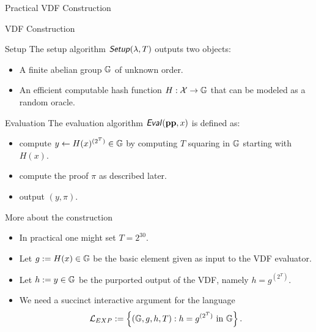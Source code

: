 \documentclass[UTF8]{beamer}
\begin{document}
	\begin{frame}
		\centering
		\huge Practical VDF Construction
	\end{frame}
	\begin{frame}{VDF Construction}
		\begin{block}{Setup}
			The setup algorithm $\textsf{\textit{Setup}}(\lambda,T)$ outputs two objects:
			\begin{itemize}
				\item A finite abelian group $\mathbb{G}$ of unknown order.
				\item An efficient computable hash function $H:\mathcal{X}\to\mathbb{G}$ that can be modeled as a random oracle.
			\end{itemize}
		\end{block}
		\begin{block}{Evaluation}
			The evaluation algorithm $\textsf{\textit{Eval}}(\mathbf{pp},x)$ is defined as:
			\begin{itemize}
				\item compute $y\gets H(x)^{(2^T)}\in\mathbb{G}$ by computing $T$ squaring in $\mathbb{G}$ starting with $H(x)$.
				\item compute the proof $\pi$ as described later.
				\item output $(y,\pi)$.
			\end{itemize}
		\end{block}
	\end{frame}
	\begin{frame}{More about the construction}
		\begin{block}{}
			\begin{itemize}
				\item In practical one might set $T=2^{30}$.
				\item Let $g:=H(x)\in\mathbb{G}$ be the basic element given as input to the VDF evaluator.
				\item Let $h:=y\in\mathbb{G}$ be the purported output of the VDF, namely $h=g^{(2^T)}$.
				\item We need a succinct interactive argument for the language
				\begin{equation*}
					\mathcal{L}_{EXP}:=\left\{
					(\mathbb{G},g,h,T):h=g^{(2^T)}~\text{in}~\mathbb{G}
					\right\}.
				\end{equation*}
			\end{itemize}
		\end{block}
	\end{frame}
\end{document}
